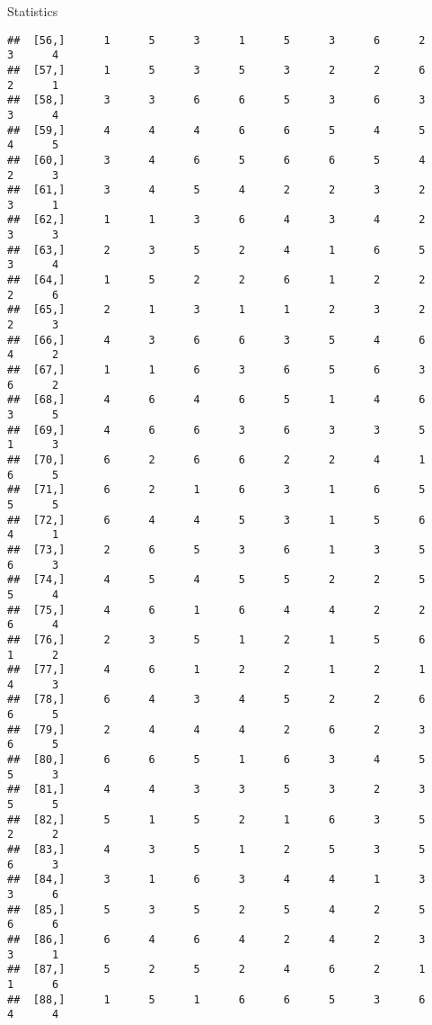 \documentclass[
  ignorenonframetext,
]{beamer}
\begin{document}
\begin{frame}[fragile]{Statistics}
\begin{verbatim}
##  [56,]      1      5      3      1      5      3      6      2      3      4
##  [57,]      1      5      3      5      3      2      2      6      2      1
##  [58,]      3      3      6      6      5      3      6      3      3      4
##  [59,]      4      4      4      6      6      5      4      5      4      5
##  [60,]      3      4      6      5      6      6      5      4      2      3
##  [61,]      3      4      5      4      2      2      3      2      3      1
##  [62,]      1      1      3      6      4      3      4      2      3      3
##  [63,]      2      3      5      2      4      1      6      5      3      4
##  [64,]      1      5      2      2      6      1      2      2      2      6
##  [65,]      2      1      3      1      1      2      3      2      2      3
##  [66,]      4      3      6      6      3      5      4      6      4      2
##  [67,]      1      1      6      3      6      5      6      3      6      2
##  [68,]      4      6      4      6      5      1      4      6      3      5
##  [69,]      4      6      6      3      6      3      3      5      1      3
##  [70,]      6      2      6      6      2      2      4      1      6      5
##  [71,]      6      2      1      6      3      1      6      5      5      5
##  [72,]      6      4      4      5      3      1      5      6      4      1
##  [73,]      2      6      5      3      6      1      3      5      6      3
##  [74,]      4      5      4      5      5      2      2      5      5      4
##  [75,]      4      6      1      6      4      4      2      2      6      4
##  [76,]      2      3      5      1      2      1      5      6      1      2
##  [77,]      4      6      1      2      2      1      2      1      4      3
##  [78,]      6      4      3      4      5      2      2      6      6      5
##  [79,]      2      4      4      4      2      6      2      3      6      5
##  [80,]      6      6      5      1      6      3      4      5      5      3
##  [81,]      4      4      3      3      5      3      2      3      5      5
##  [82,]      5      1      5      2      1      6      3      5      2      2
##  [83,]      4      3      5      1      2      5      3      5      6      3
##  [84,]      3      1      6      3      4      4      1      3      3      6
##  [85,]      5      3      5      2      5      4      2      5      6      6
##  [86,]      6      4      6      4      2      4      2      3      3      1
##  [87,]      5      2      5      2      4      6      2      1      1      6
##  [88,]      1      5      1      6      6      5      3      6      4      4

\end{verbatim}
\end{frame}
\end{document}
